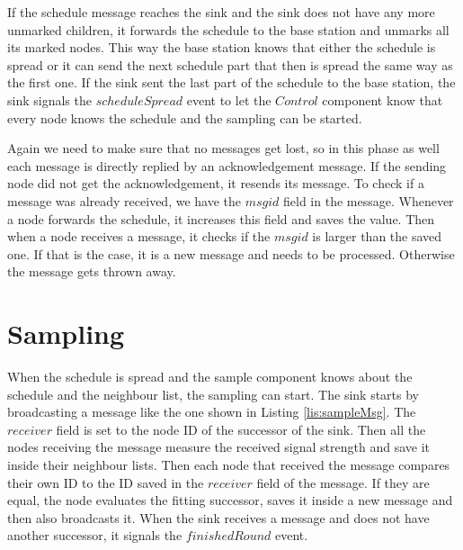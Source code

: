 If the schedule message reaches the sink and the sink does not have any more unmarked children, it forwards the schedule to the base station and unmarks all its marked nodes. This way the base station knows that either the schedule is spread or it can send the next schedule part that then is spread the same way as the first one. If the sink sent the last part of the schedule to the base station, the sink signals the $scheduleSpread$ event to let the $Control$ component know that every node knows the schedule and the sampling can be started. 

Again we need to make sure that no messages get lost, so in this phase as well each message is directly replied by an acknowledgement message. If the sending node did not get the acknowledgement, it resends its message. To check if a message was already received, we have the $msgid$ field in the message. Whenever a node forwards the schedule, it increases this field and saves the value. Then when a node receives a message, it checks if the $msgid$ is larger than the saved one. If that is the case, it is a new message and needs to be processed. Otherwise the message gets thrown away. 
\section{Sampling}
When the schedule is spread and the sample component knows about the schedule and the neighbour list, the sampling can start. The sink starts by broadcasting a message like the one shown in Listing \ref{lis:sampleMsg}. The $receiver$ field is set to the node ID of the successor of the sink. Then all the nodes receiving the message measure the received signal strength and save it inside their neighbour lists. Then each node that received the message compares their own ID to the ID saved in the $receiver$ field of the message. If they are equal, the node evaluates the fitting successor, saves it inside a new message and then also broadcasts it. When the sink receives a message and does not have another successor, it signals the $finishedRound$ event.

